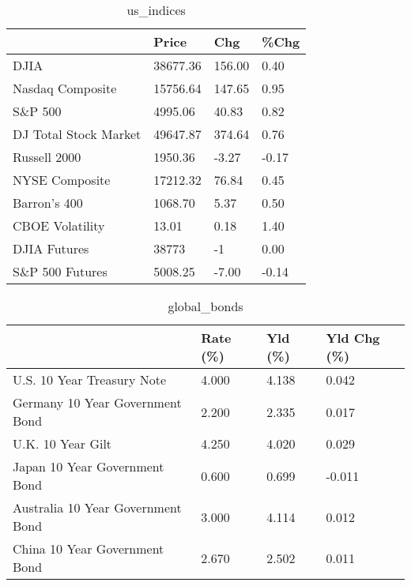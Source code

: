 \documentclass{article}%
\begin{document}
%


\begin{table}[htbp]%
\caption{us\_indices}%
\centering%
\begin{adjustbox}{width=1\textwidth}%
\begin{tabular}{llll}
\toprule
                      &    Price &    Chg &  \%Chg \\
\midrule
                 DJIA & 38677.36 & 156.00 &  0.40 \\
     Nasdaq Composite & 15756.64 & 147.65 &  0.95 \\
              S\&P 500 &  4995.06 &  40.83 &  0.82 \\
DJ Total Stock Market & 49647.87 & 374.64 &  0.76 \\
         Russell 2000 &  1950.36 &  -3.27 & -0.17 \\
       NYSE Composite & 17212.32 &  76.84 &  0.45 \\
         Barron's 400 &  1068.70 &   5.37 &  0.50 \\
      CBOE Volatility &    13.01 &   0.18 &  1.40 \\
         DJIA Futures &    38773 &     -1 &  0.00 \\
      S\&P 500 Futures &  5008.25 &  -7.00 & -0.14 \\
\bottomrule
\end{tabular}
%
\end{adjustbox}%
\end{table}

%


\begin{table}[htbp]%
\caption{global\_bonds}%
\centering%
\begin{adjustbox}{width=1\textwidth}%
\begin{tabular}{llll}
\toprule
                                  & Rate (\%) & Yld (\%) & Yld Chg (\%) \\
\midrule
       U.S. 10 Year Treasury Note &    4.000 &   4.138 &       0.042 \\
  Germany 10 Year Government Bond &    2.200 &   2.335 &       0.017 \\
                U.K. 10 Year Gilt &    4.250 &   4.020 &       0.029 \\
    Japan 10 Year Government Bond &    0.600 &   0.699 &      -0.011 \\
Australia 10 Year Government Bond &    3.000 &   4.114 &       0.012 \\
    China 10 Year Government Bond &    2.670 &   2.502 &       0.011 \\
\bottomrule
\end{tabular}
%
\end{adjustbox}%
\end{table}
\end{document}
